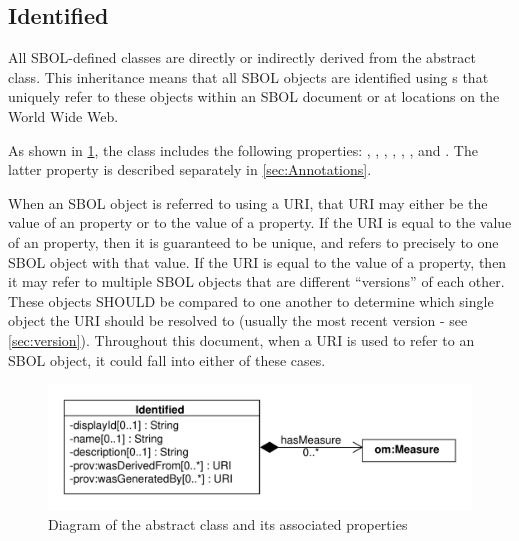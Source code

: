 \subsection{Identified}
\label{sec:Identified}


All SBOL-defined classes are directly or indirectly derived from the   abstract class. This inheritance means that all SBOL objects are identified using s that uniquely refer to these objects within an SBOL document or at locations on the World Wide Web. 

As shown in \ref{uml:identified}, the  class includes the following properties: , ,  , , , , and . The latter property is described separately in \ref{sec:Annotations}.

When an SBOL object is referred to using a URI, that URI may either be the value of an  property or to the value of a  property.
If the URI is equal to the value of an  property, then it is guaranteed to be unique, and refers to precisely to one SBOL object with that value.
If the URI is equal to the value of a  property, then it may refer to multiple SBOL objects that are different ``versions'' of each other. These objects SHOULD be compared to one another to determine which single object the URI should be resolved to (usually the most recent version - see \ref{sec:version}).
Throughout this document, when a URI is used to refer to an SBOL object, it could fall into either of these cases.

\begin{figure}[ht]
\begin{center}
\includegraphics[scale=0.6]{uml/identified}
\caption[]{Diagram of the  abstract class and its associated properties}
\label{uml:identified}
\end{center}
\end{figure}


